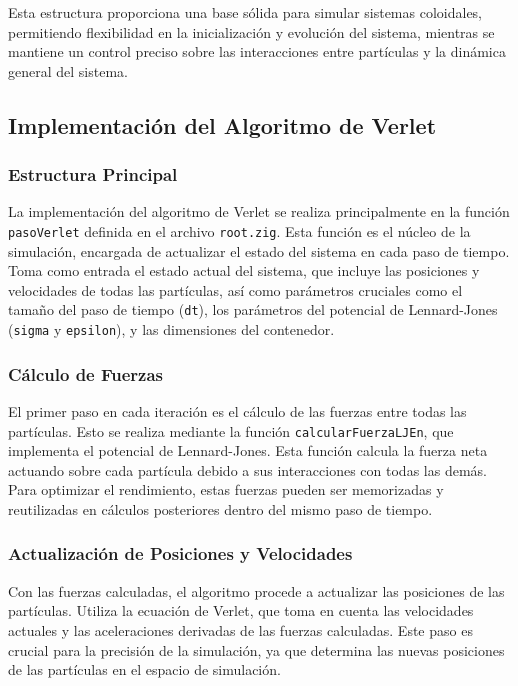 \documentclass[twocolumn]{article}
\begin{document}
Esta estructura proporciona una base sólida para simular sistemas coloidales, permitiendo flexibilidad en la inicialización y evolución del sistema, mientras se mantiene un control preciso sobre las interacciones entre partículas y la dinámica general del sistema.

\subsection*{Implementación del Algoritmo de Verlet}

\subsubsection*{Estructura Principal}

La implementación del algoritmo de Verlet se realiza principalmente en la función \texttt{pasoVerlet} definida en el archivo \texttt{root.zig}. Esta función es el núcleo de la simulación, encargada de actualizar el estado del sistema en cada paso de tiempo. Toma como entrada el estado actual del sistema, que incluye las posiciones y velocidades de todas las partículas, así como parámetros cruciales como el tamaño del paso de tiempo (\texttt{dt}), los parámetros del potencial de Lennard-Jones (\texttt{sigma} y \texttt{epsilon}), y las dimensiones del contenedor.

\subsubsection*{Cálculo de Fuerzas}

El primer paso en cada iteración es el cálculo de las fuerzas entre todas las partículas. Esto se realiza mediante la función \texttt{calcularFuerzaLJEn}, que implementa el potencial de Lennard-Jones. Esta función calcula la fuerza neta actuando sobre cada partícula debido a sus interacciones con todas las demás. Para optimizar el rendimiento, estas fuerzas pueden ser memorizadas y reutilizadas en cálculos posteriores dentro del mismo paso de tiempo.

\subsubsection*{Actualización de Posiciones y Velocidades}

Con las fuerzas calculadas, el algoritmo procede a actualizar las posiciones de las partículas. Utiliza la ecuación de Verlet, que toma en cuenta las velocidades actuales y las aceleraciones derivadas de las fuerzas calculadas. Este paso es crucial para la precisión de la simulación, ya que determina las nuevas posiciones de las partículas en el espacio de simulación.
\end{document}
